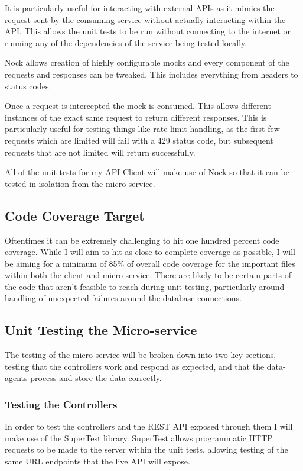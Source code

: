 It is particularly useful for interacting with external APIs as it mimics the request sent by the consuming service without actually interacting within the API. This allows the unit tests to be run without connecting to the internet or running any of the dependencies of the service being tested locally. 

Nock allows creation of highly configurable mocks and every component of the requests and responses can be tweaked. This includes everything from headers to status codes.

Once a request is intercepted the mock is consumed. This allows different instances of the exact same request to return different responses. This is particularly useful for testing things like rate limit handling, as the first few requests which are limited will fail with a 429 status code, but subsequent requests that are not limited will return successfully.

All of the unit tests for my API Client will make use of Nock so that it can be tested in isolation from the micro-service.
\subsection{Code Coverage Target}
Oftentimes it can be extremely challenging to hit one hundred percent code coverage. While I will aim to hit as close to complete coverage as possible, I will be aiming for a minimum of 85\% of overall code coverage for the important files within both the client and micro-service. There are likely to be certain parts of the code that aren't feasible to reach during unit-testing, particularly around handling of unexpected failures around the database connections.
\subsection{Unit Testing the Micro-service}
The testing of the micro-service will be broken down into two key sections, testing that the controllers work and respond as expected, and that the data-agents process and store the data correctly.
\subsubsection{Testing the Controllers}
In order to test the controllers and the REST API exposed through them I will make use of the SuperTest library. SuperTest allows programmatic HTTP requests to be made to the server within the unit tests, allowing testing of the same URL endpoints that the live API will expose.

